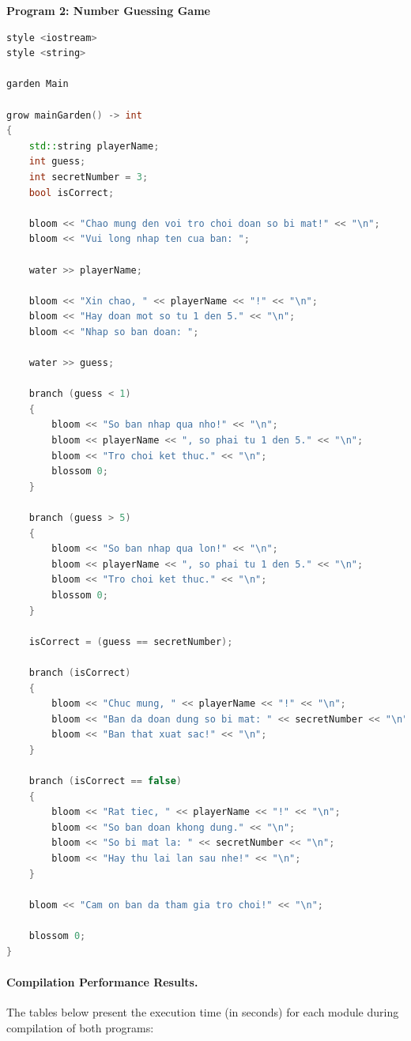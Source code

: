 \documentclass[conference]{IEEEtran}
\begin{document}
\textbf{Program 2: Number Guessing Game}
\begin{lstlisting}[language=C++, caption={Sample Program 2: Number Guessing Game (Hanami-like syntax)}, label={lst:perf_prog2}, basicstyle=\ttfamily\scriptsize, columns=flexible]
style <iostream>
style <string>

garden Main

grow mainGarden() -> int 
{
    std::string playerName;
    int guess;
    int secretNumber = 3;
    bool isCorrect;
    
    bloom << "Chao mung den voi tro choi doan so bi mat!" << "\n";
    bloom << "Vui long nhap ten cua ban: ";
    
    water >> playerName;
    
    bloom << "Xin chao, " << playerName << "!" << "\n";
    bloom << "Hay doan mot so tu 1 den 5." << "\n";
    bloom << "Nhap so ban doan: ";
    
    water >> guess;
    
    branch (guess < 1) 
    {
        bloom << "So ban nhap qua nho!" << "\n";
        bloom << playerName << ", so phai tu 1 den 5." << "\n";
        bloom << "Tro choi ket thuc." << "\n";
        blossom 0;
    }
    
    branch (guess > 5) 
    {
        bloom << "So ban nhap qua lon!" << "\n";
        bloom << playerName << ", so phai tu 1 den 5." << "\n";
        bloom << "Tro choi ket thuc." << "\n";
        blossom 0;
    }
    
    isCorrect = (guess == secretNumber);
    
    branch (isCorrect) 
    {
        bloom << "Chuc mung, " << playerName << "!" << "\n";
        bloom << "Ban da doan dung so bi mat: " << secretNumber << "\n";
        bloom << "Ban that xuat sac!" << "\n";
    }
    
    branch (isCorrect == false) 
    {
        bloom << "Rat tiec, " << playerName << "!" << "\n";
        bloom << "So ban doan khong dung." << "\n";
        bloom << "So bi mat la: " << secretNumber << "\n";
        bloom << "Hay thu lai lan sau nhe!" << "\n";
    }
    
    bloom << "Cam on ban da tham gia tro choi!" << "\n";
    
    blossom 0;
}
\end{lstlisting}

\paragraph{Compilation Performance Results.}
The tables below present the execution time (in seconds) for each module during compilation of both programs:
\end{document}
